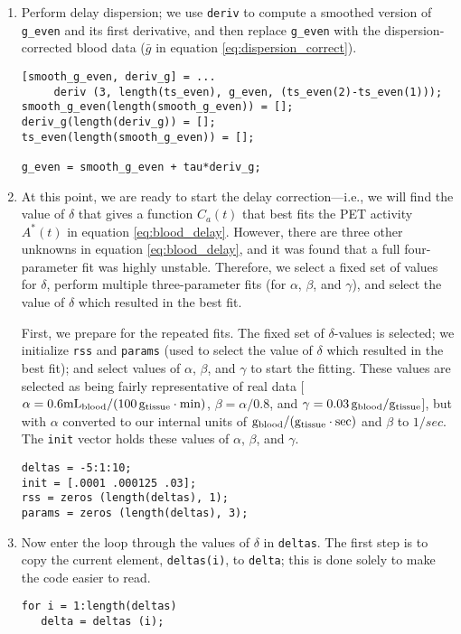 \documentclass[12pt]{article}
\def\code#1{{\tt #1}}
\begin{document}
\begin{enumerate}
\item Perform delay dispersion; we use \code{deriv} to compute a
  smoothed version of \code{g\_even} and its first derivative, and
  then replace \code{g\_even} with the dispersion-corrected
  blood data ($\bar g$ in equation \ref{eq:dispersion_correct}).
\begin{verbatim}
[smooth_g_even, deriv_g] = ...
     deriv (3, length(ts_even), g_even, (ts_even(2)-ts_even(1)));
smooth_g_even(length(smooth_g_even)) = [];
deriv_g(length(deriv_g)) = [];
ts_even(length(smooth_g_even)) = [];
 
g_even = smooth_g_even + tau*deriv_g;
\end{verbatim}

\item At this point, we are ready to start the delay
  correction---i.e., we will find the value of $\delta$ that gives a
  function $C_a (t)$ that best fits the PET activity $A^{*}(t)$ in
  equation \ref{eq:blood_delay}.  However, there are three other
  unknowns in equation \ref{eq:blood_delay}, and it was found that a
  full four-parameter fit was highly unstable.  Therefore, we select a
  fixed set of values for $\delta$, perform multiple three-parameter
  fits (for $\alpha$, $\beta$, and $\gamma$), and select the value of
  $\delta$ which resulted in the best fit.

  First, we prepare for the repeated fits.  The fixed set of
  $\delta$-values is selected; we initialize \code{rss} and
  \code{params} (used to select the value of $\delta$ which resulted in
  the best fit); and select values of $\alpha$, $\beta$, and $\gamma$
  to start the fitting.  These values are selected as being fairly
  representative of real data 
  [$\alpha = 0.6 {\rm mL_{blood} / (100 \, g_{tissue} \cdot min)}$, 
   $\beta = \alpha / 0.8$, and $\gamma = 0.03 \, {\rm g_{blood}/g_{tissue}}$],
  but with $\alpha$ converted to our internal units of 
  ${\rm g_{blood} / (g_{tissue} \cdot sec)}$ and $\beta$ to $1/sec$.
  The \code{init} vector holds these values of $\alpha$, $\beta$, and 
  $\gamma$.
\begin{verbatim}
deltas = -5:1:10;
init = [.0001 .000125 .03];
rss = zeros (length(deltas), 1);
params = zeros (length(deltas), 3);
\end{verbatim}

\item Now enter the loop through the values of $\delta$ in
  \code{deltas}.  The first step is to copy the current element,
  \code{deltas(i)}, to \code{delta}; this is done solely to make the
  code easier to read.
  \begin{verbatim}
for i = 1:length(deltas)
   delta = deltas (i);
  \end{verbatim}


\end{enumerate}
\end{document}
